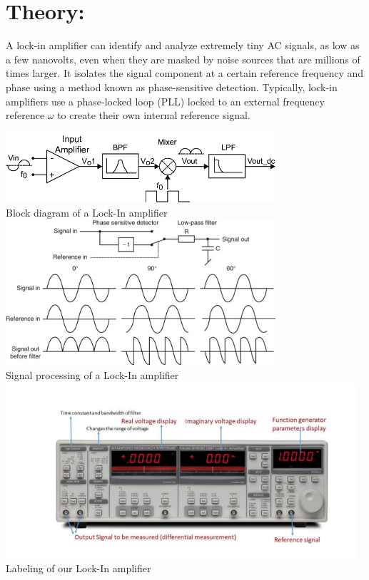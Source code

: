 \documentclass[]{report}[12 pt]
\begin{document}
	\section*{Theory:}
A lock-in amplifier can identify and analyze extremely tiny AC signals, as low as a few nanovolts, even when they are masked by noise sources that are millions of times larger. It isolates the signal component at a certain reference frequency and phase using a method known as phase-sensitive detection.
Typically, lock-in amplifiers use a phase-locked loop (PLL) locked to an external frequency reference $\omega$  to create their own internal reference signal.
\begin{center}
	\includegraphics[width=10cm]{lia1.png}\\
	Block diagram of a Lock-In amplifier\\
	\vspace{1 cm}
		\includegraphics[width=10cm]{lia2.jpg}\\
		Signal processing of a Lock-In amplifier\\
		\includegraphics[width=13cm]{lia3.png}\\
		Labeling of our Lock-In amplifier
\end{center}
\end{document}
